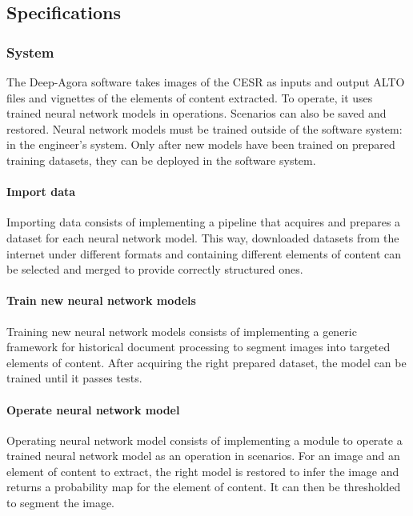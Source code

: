 \documentclass{polytech/polytech}
\numberwithin{figure}{chapter}
\begin{document}
\subsection{Specifications}

\subsubsection{System}

The Deep-Agora software takes images of the CESR as inputs and output ALTO files and vignettes of the elements of content extracted.
To operate, it uses trained neural network models in operations.
Scenarios can also be saved and restored.
Neural network models must be trained outside of the software system: in the engineer's system.
Only after new models have been trained on prepared training datasets, they can be deployed in the software system.
\\
\label{diagSysEnv}

\paragraph{Import data}

Importing data consists of implementing a pipeline that acquires and prepares a dataset for each neural network model.
This way, downloaded datasets from the internet under different formats and containing different elements of content can be selected and merged to provide correctly structured ones.

\paragraph{Train new neural network models}

Training new neural network models consists of implementing a generic framework for historical document processing to segment images into targeted elements of content.
After acquiring the right prepared dataset, the model can be trained until it passes tests.

\paragraph{Operate neural network model}

Operating neural network model consists of implementing a module to operate a trained neural network model as an operation in scenarios.
For an image and an element of content to extract, the right model is restored to infer the image and returns a probability map for the element of content.
It can then be thresholded to segment the image.
\end{document}
